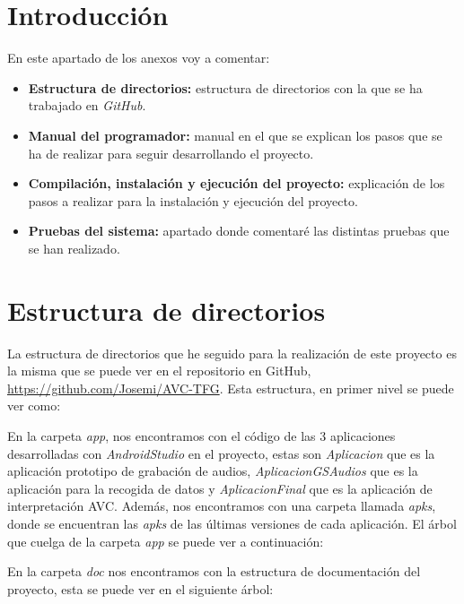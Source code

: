 
\section{Introducción}
En este apartado de los anexos voy a comentar:
\begin{itemize}
	\item \textbf{Estructura de directorios:} estructura de directorios con la que se ha trabajado en \textit{GitHub}.
	\item \textbf{Manual del programador:} manual en el que se explican los pasos que se ha de realizar para seguir desarrollando el proyecto.
	\item \textbf{Compilación, instalación y ejecución del proyecto:} explicación de los pasos a realizar para la instalación y ejecución del proyecto.
	\item \textbf{Pruebas del sistema:} apartado donde comentaré las distintas pruebas que se han realizado.
\end{itemize}
\section{Estructura de directorios}
La estructura de directorios que he seguido para la realización de este proyecto es la misma que se puede ver en el repositorio en GitHub, \url{https://github.com/Josemi/AVC-TFG}. Esta estructura, en primer nivel se puede ver como:

En la carpeta \textit{app}, nos encontramos con el código de las 3 aplicaciones desarrolladas con \textit{AndroidStudio} en el proyecto, estas son \textit{Aplicacion} que es la aplicación prototipo de grabación de audios, \textit{AplicacionGSAudios} que es la aplicación para la recogida de datos y \textit{AplicacionFinal} que es la aplicación de interpretación AVC. Además, nos encontramos con una carpeta llamada \textit{apks}, donde se encuentran las \textit{apks} de las últimas versiones de cada aplicación. El árbol que cuelga de la carpeta \textit{app} se puede ver a continuación:


En la carpeta \textit{doc} nos encontramos con la estructura de documentación del proyecto, esta se puede ver en el siguiente árbol:

